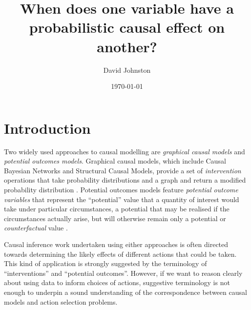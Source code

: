 \documentclass{article}
\title{When does one variable have a probabilistic causal effect on another?}
\date{\today}
\author{ David Johnston }
\theoremstyle{plain}
\theoremstyle{definition}
\begin{document}
\maketitle


\tableofcontents


\section{Introduction}

Two widely used approaches to causal modelling are \emph{graphical causal models} and \emph{potential outcomes models}. Graphical causal models, which include Causal Bayesian Networks and Structural Causal Models, provide a set of \emph{intervention} operations that take probability distributions and a graph and return a modified probability distribution \citep{pearl_causality:_2009}. Potential outcomes models feature \emph{potential outcome variables} that represent the ``potential'' value that a quantity of interest would take under particular circumstances, a potential that may be realised if the circumstances actually arise, but will otherwise remain only a potential or \emph{counterfactual} value \citep{rubin_causal_2005}.

Causal inference work undertaken using either approaches is often directed towards determining the likely effects of different actions that could be taken. This kind of application is strongly suggested by the terminology of ``interventions'' and ``potential outcomes''. However, if we want to reason clearly about using data to inform choices of actions, suggestive terminology is not enough to underpin a sound understanding of the correspondence between causal models and action selection problems.

\end{document}
